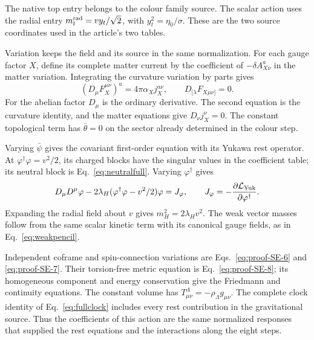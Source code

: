 \documentclass[aps,prx,onecolumn,10pt,notitlepage,nofootinbib,longbibliography]{revtex4-2}
\numberwithin{equation}{section}
\numberwithin{table}{section}
\begin{document}
The native top entry belongs to the colour family source. The scalar
action uses the radial entry $m_t^{\rm rad}=vy_t/\sqrt2$, with
$y_t^2=\eta_0/\sigma$. These are the two source coordinates used in the
article's two tables.

Variation keeps the field and its source in the same normalization.
For each gauge factor $X$, define its complete matter current by the
coefficient of $-\delta A_{X\nu}^a$ in the matter variation. Integrating
the curvature variation by parts gives
\begin{equation}
 (D_\mu F_X^{\mu\nu})^a=4\pi\alpha_Xj_X^{a\nu},\qquad
 D_{[\lambda}F_{X\mu\nu]}=0.
 \label{eq:actiongaugevariation}
\end{equation}
For the abelian factor $D_\mu$ is the ordinary derivative. The second
equation is the curvature identity, and the matter equations give
$D_\nu j_X^\nu=0$. The constant topological term has
$\bar\theta=0$ on the sector already determined in the colour step.

Varying $\bar\psi$ gives the covariant first-order equation with its
Yukawa rest operator. At $\varphi^\dagger\varphi=v^2/2$, its charged
blocks have the singular values in the coefficient table; its neutral
block is Eq.~\eqref{eq:neutralfull}. Varying $\varphi^\dagger$ gives
\begin{equation}
 D_\mu D^\mu\varphi
 -2\lambda_H(\varphi^\dagger\varphi-v^2/2)\varphi
 =J_\varphi,
 \qquad J_\varphi=-\frac{\partial\mathcal L_{\rm Yuk}}
                         {\partial\varphi^\dagger}.
 \label{eq:actionscalarvariation}
\end{equation}
Expanding the radial field about $v$ gives $m_H^2=2\lambda_Hv^2$.
The weak vector masses follow from the same scalar kinetic term with its
canonical gauge fields, as in Eq.~\eqref{eq:weakpencil}.

Independent coframe and spin-connection variations are
Eqs.~\eqref{eq:proof-SE-6} and \eqref{eq:proof-SE-7}. Their
torsion-free metric equation is Eq.~\eqref{eq:proof-SE-8}; its
homogeneous component and energy conservation give the Friedmann and
continuity equations. The constant volume has
$T_{\mu\nu}^{\Lambda}=-\rho_\Lambda g_{\mu\nu}$. The complete clock
identity of Eq.~\eqref{eq:fullclock} includes every rest contribution in
the gravitational source. Thus the coefficients of this action are the
same normalized responses that supplied the rest equations and the
interactions along the eight steps.
\end{document}
